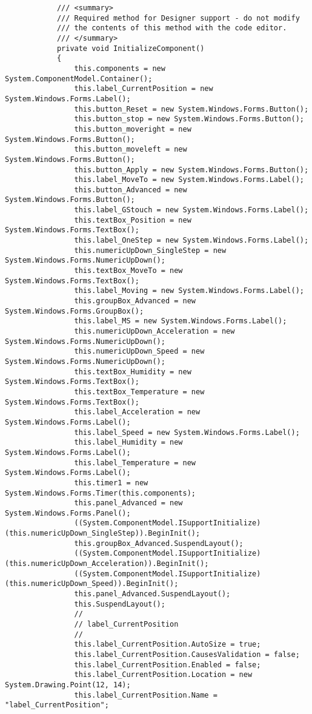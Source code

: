 \begin{lstlisting}
			/// <summary>
			/// Required method for Designer support - do not modify
			/// the contents of this method with the code editor.
			/// </summary>
			private void InitializeComponent()
			{
				this.components = new System.ComponentModel.Container();
				this.label_CurrentPosition = new System.Windows.Forms.Label();
				this.button_Reset = new System.Windows.Forms.Button();
				this.button_stop = new System.Windows.Forms.Button();
				this.button_moveright = new System.Windows.Forms.Button();
				this.button_moveleft = new System.Windows.Forms.Button();
				this.button_Apply = new System.Windows.Forms.Button();
				this.label_MoveTo = new System.Windows.Forms.Label();
				this.button_Advanced = new System.Windows.Forms.Button();
				this.label_GStouch = new System.Windows.Forms.Label();
				this.textBox_Position = new System.Windows.Forms.TextBox();
				this.label_OneStep = new System.Windows.Forms.Label();
				this.numericUpDown_SingleStep = new System.Windows.Forms.NumericUpDown();
				this.textBox_MoveTo = new System.Windows.Forms.TextBox();
				this.label_Moving = new System.Windows.Forms.Label();
				this.groupBox_Advanced = new System.Windows.Forms.GroupBox();
				this.label_MS = new System.Windows.Forms.Label();
				this.numericUpDown_Acceleration = new System.Windows.Forms.NumericUpDown();
				this.numericUpDown_Speed = new System.Windows.Forms.NumericUpDown();
				this.textBox_Humidity = new System.Windows.Forms.TextBox();
				this.textBox_Temperature = new System.Windows.Forms.TextBox();
				this.label_Acceleration = new System.Windows.Forms.Label();
				this.label_Speed = new System.Windows.Forms.Label();
				this.label_Humidity = new System.Windows.Forms.Label();
				this.label_Temperature = new System.Windows.Forms.Label();
				this.timer1 = new System.Windows.Forms.Timer(this.components);
				this.panel_Advanced = new System.Windows.Forms.Panel();
				((System.ComponentModel.ISupportInitialize)(this.numericUpDown_SingleStep)).BeginInit();
				this.groupBox_Advanced.SuspendLayout();
				((System.ComponentModel.ISupportInitialize)(this.numericUpDown_Acceleration)).BeginInit();
				((System.ComponentModel.ISupportInitialize)(this.numericUpDown_Speed)).BeginInit();
				this.panel_Advanced.SuspendLayout();
				this.SuspendLayout();
				// 
				// label_CurrentPosition
				// 
				this.label_CurrentPosition.AutoSize = true;
				this.label_CurrentPosition.CausesValidation = false;
				this.label_CurrentPosition.Enabled = false;
				this.label_CurrentPosition.Location = new System.Drawing.Point(12, 14);
				this.label_CurrentPosition.Name = "label_CurrentPosition";

\end{lstlisting}
